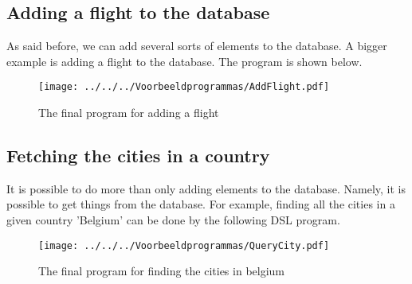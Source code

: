 \subsection{Adding a flight to the database}
As said before, we can add several sorts of elements to the database. A bigger example is adding a flight to the database. The program is shown below.
\begin{figure}[H]
	\centering
	\texttt{[image: ../../../Voorbeeldprogrammas/AddFlight.pdf]}
	\caption{The final program for adding a flight}
	\label{ex:addFlight}
\end{figure}

\subsection{Fetching the cities in a country}
It is possible to do more than only adding elements to the database. Namely, it is possible to get things from the database. For example, finding all the cities in a given country 'Belgium' can be done by the following DSL program.
\begin{figure}[H]
	\centering
	\texttt{[image: ../../../Voorbeeldprogrammas/QueryCity.pdf]}
	\caption{The final program for finding the cities in belgium}
	\label{ex:getCities}
\end{figure}